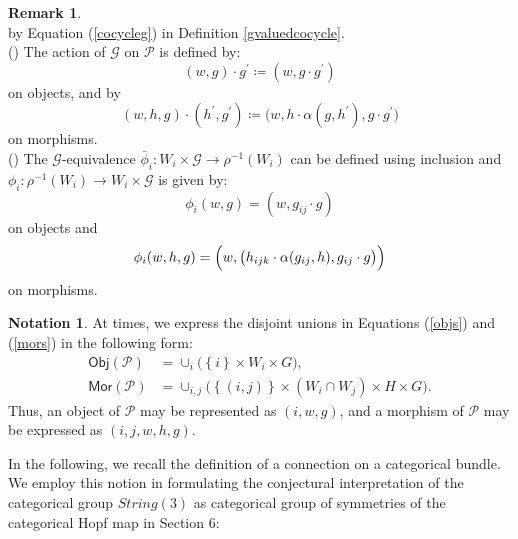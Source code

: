 \documentclass{article}
\theoremstyle{plain}
\theoremstyle{definition}
\newtheorem{rem}[thm]{Remark}
\newtheorem{nota}[thm]{Notation}
\newcommand{\rNum}[1]{\lowercase\expandafter{\romannumeral #1\relax}}
\begin{document}
\begin{rem}
\[\]
by Equation (\ref{cocycleg}) in Definition \ref{gvaluedcocycle}.  \\
(\rNum{2}) The action of $\mathcal{G}$ on $\mathcal{P}$ is defined by:
\[
(w,g) \cdot g^\prime \coloneq (w,g \cdot g^\prime)
\]
on objects, and by
\[
(w,h,g) \cdot (h^\prime,g^\prime) \coloneq \bigr(w,h \cdot \alpha(g,h^\prime),g \cdot g^\prime\bigr)
\]
on morphisms. \\
(\rNum{3}) The $\mathcal{G}$-equivalence $\bar{\phi}_i:W_i \times \mathcal{G} \longrightarrow \rho^{-1}(W_i)$ can be defined using inclusion and $\phi_i:\rho^{-1}(W_i) \longrightarrow W_i \times \mathcal{G}$ is
given by:
\[
\phi_i(w,g) = (w,g_{ij} \cdot g)
\]
on objects and
\[
\phi_i(w,h,g) = \Bigl(w,\bigl(h_{ijk} \cdot \alpha(g_{ij},h),g_{ij} \cdot g\bigr)\Bigr)
\]
on morphisms.
\end{rem}
\begin{nota}\label{objmornewform}
At times, we express the disjoint unions in Equations (\ref{objs}) and (\ref{mors}) in the following form:
\begin{align*}
\mathsf{Obj}(\mathcal{P}) & = \cup_i \bigl(\left\{i\right\} \times W_i \times G\bigr), \\
\mathsf{Mor}(\mathcal{P}) & = \cup_{i,j} \bigl(\left\{(i,j)\right\} \times (W_i \cap W_j) \times H \times G\bigr).
\end{align*}
Thus, an object of $\mathcal{P}$ may be represented as $(i,w,g)$, and a morphism of $\mathcal{P}$ may be expressed as $(i,j,w,h,g)$.
\end{nota}
In the following, we recall the definition of a connection on a categorical bundle. We employ this notion in formulating the conjectural interpretation of the categorical group $String(3)$ as categorical group of symmetries of the categorical Hopf map in Section $6$:
\end{document}
